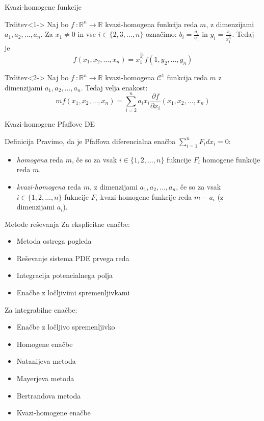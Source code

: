 \documentclass[t, 8pt]{beamer} %
\newcommand{\mth}[1]{\ensuremath{\mathbb{#1}}}
\newcommand{\R}{\mth{R}}
\newcommand{\pojem}[1]{\emph{#1}}
\newcommand{\map}[3]{\ensuremath{{#1}~: {#2} \rightarrow {#3}}}
\newcommand{\fillblack}[1]{
	\begin{tikzpicture}[remember picture, overlay]
		\node [shift={(0 cm,0cm)}]  at (current page.south west)
		{%
			\begin{tikzpicture}[remember picture, overlay] at (current page.south west)
				\draw [fill=black] (0, 0) -- (0,#1 \paperheight) --
				(\paperwidth,#1 \paperheight) -- (\paperwidth,0) -- cycle ;
			\end{tikzpicture}
		};
		\draw (current page.north west) rectangle (current page.south east);
	\end{tikzpicture}
}
\begin{document}
	\begin{frame}{Kvazi-homogene funkcije}
		
		\begin{block}{Trditev}<1->
			Naj bo $\map{f}{\R^n}{\R}$ kvazi-homogena funkcija reda $m$, z dimenzijami $a_1, a_2, \ldots, a_n$. Za $x_1 \neq 0$ in vse $i\in \{2, 3, \ldots, n\}$ označimo: $b_i = \frac{a_i}{a_1}$ in $y_i = \frac{x_i}{x_1^{b_i}}$. Tedaj je $$f(x_1, x_2, \ldots, x_n) = x_1^{\frac{m}{a_1}}f(1, y_2, \ldots, y_n)$$
		\end{block}
		
		\begin{block}{Trditev}<2->
			Naj bo $\map{f}{\R^n}{\R}$ kvazi-homogena $\mathcal{C}^1$ funkcija reda $m$ z dimenzijami $a_1, a_2, \ldots, a_n$. Tedaj velja enakost: $$mf(x_1, x_2, \ldots, x_n) = \sum_{i = 2}^{n}a_ix_i\frac{\partial f}{\partial x_i}(x_1, x_2, \ldots, x_n)$$
		\end{block}
		\end{frame}
		
		\begin{frame}{Kvazi-homogene Pfaffove DE}
			\begin{block}{Definicija}
				Pravimo, da je Pfaffova diferencialna enačba $\sum_{i = 1}^n F_i dx_i = 0$:\begin{itemize}
					\item \pojem{homogena} reda $m$, če so za vsak $i\in\{1, 2, \ldots, n\}$ fukncije $F_i$ homogene funkcije reda $m$.
					\item \pojem{kvazi-homogena} reda $m$, z dimenzijami $a_1, a_2, \ldots, a_n$, če so za vsak $i\in\{1, 2, \ldots, n\}$ fukncije $F_i$ kvazi-homogene funkcije reda $m - a_i$ (z dimenzijami $a_i$).
				\end{itemize} 
			\end{block}
		\end{frame}
		
		\begin{frame}{Metode reševanja}
			Za eksplicitne enačbe:\begin{itemize}
				\item Metoda ostrega pogleda
				\item Reševanje sistema PDE prvega reda
				\item Integracija potencialnega polja
				\item Enačbe z ločljivimi spremenljivkami
			\end{itemize}
			
			Za integrabilne enačbe:\begin{itemize}
				\item Enačbe z ločljivo spremenljivko
				\item Homogene enačbe
				\item Natanijeva metoda
				\item Mayerjeva metoda
				\item Bertrandova metoda
				\item Kvazi-homogene enačbe
			\end{itemize}
		\end{frame}
		
\end{document}
